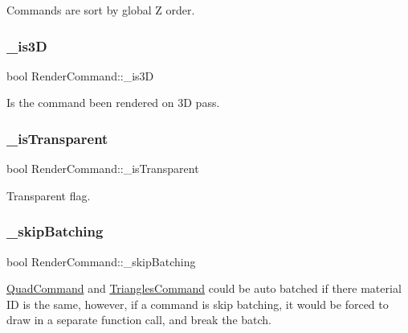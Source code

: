 Commands are sort by global Z order. \mbox{\label{classRenderCommand_a90ea4cfb1643151cf15420c87f93aac2}} 
\subsubsection{\texorpdfstring{\+\_\+is3D}{\_is3D}}
{\footnotesize\ttfamily bool Render\+Command\+::\+\_\+is3D\hspace{0.3cm}{\ttfamily [protected]}}

Is the command been rendered on 3D pass. \mbox{\label{classRenderCommand_adff7217f778be8e290b72b43709ae999}} 
\subsubsection{\texorpdfstring{\+\_\+is\+Transparent}{\_isTransparent}}
{\footnotesize\ttfamily bool Render\+Command\+::\+\_\+is\+Transparent\hspace{0.3cm}{\ttfamily [protected]}}

Transparent flag. \mbox{\label{classRenderCommand_a9b726a6dd50cf99cc70474f0033bf592}} 
\subsubsection{\texorpdfstring{\+\_\+skip\+Batching}{\_skipBatching}}
{\footnotesize\ttfamily bool Render\+Command\+::\+\_\+skip\+Batching\hspace{0.3cm}{\ttfamily [protected]}}

\hyperlink{classQuadCommand}{Quad\+Command} and \hyperlink{classTrianglesCommand}{Triangles\+Command} could be auto batched if there material ID is the same, however, if a command is skip batching, it would be forced to draw in a separate function call, and break the batch. \mbox{\label{classRenderCommand_ac1112fb1b5d70f9c08d2625d501377de}} 
